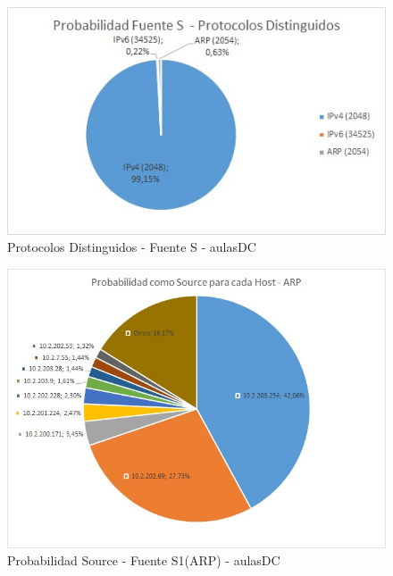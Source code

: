 \begin{figure}[h!]
\centering
\includegraphics[width=\textwidth]{./img/probaS_aulasDC.jpg}
\caption{Protocolos Distinguidos - Fuente S - aulasDC}
\end{figure}
\newpage

\begin{figure}[h!]
\centering
\includegraphics[width=\textwidth]{./img/proba_src_aulasDC.jpg}
\caption{Probabilidad Source - Fuente S1(ARP) - aulasDC}
\end{figure}

